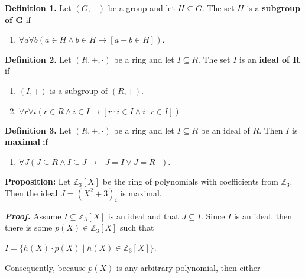 \documentclass[12pt, a4paper]{article}
\begin{document}
\noindent\textbf{Definition 1.} Let $(G,+)$ be a group and let $H\subseteq G$. The set $H$ is a \textbf{subgroup of G} if\par

\vspace{2mm}

\begin{enumerate}
    \item $\forall a\forall b(a\in H\wedge b\in H\rightarrow[a-b\in H])$.
\end{enumerate}

\noindent\textbf{Definition 2.} Let $(R,+,\cdot)$ be a ring and let $I\subseteq R$. The set $I$ is an \textbf{ideal of R} if\par

\vspace{2mm}

\begin{enumerate}
    \item $(I, +)$ is a subgroup of $(R,+)$.
    \item $\forall r\forall i(r\in R\wedge i\in I\rightarrow [r\cdot i\in I\wedge i\cdot r\in I])$
\end{enumerate}

\noindent\textbf{Definition 3.} Let $(R,+,\cdot)$ be a ring and let $I\subseteq R$ be an ideal of $R$. Then $I$ is \textbf{maximal} if

\begin{enumerate}
    \item $\forall J(J\subseteq R\wedge I\subseteq J\rightarrow[J=I\vee J=R])$.
\end{enumerate}

\noindent\textbf{Proposition:} Let $\mathbb{Z}_3[X]$ be the ring of polynomials with coefficients from $\mathbb{Z}_3$. Then the ideal $J=(X^2+3)_i$ is maximal.

\vspace{4mm}

\noindent\textbf{\textit{Proof.}} Assume $I\subseteq\mathbb{Z}_3[X]$ is an ideal and that $J\subseteq I$. Since $I$ is an ideal, then there is some $p(X)\in\mathbb{Z}_3[X]$ such that

\vspace{4mm}

\centerline{$I=\{h(X)\cdot p(X)\mid h(X)\in\mathbb{Z}_3[X]\}$.}

\vspace{4mm}

\noindent Consequently, because $p(X)$ is any arbitrary polynomial, then either
\end{document}

